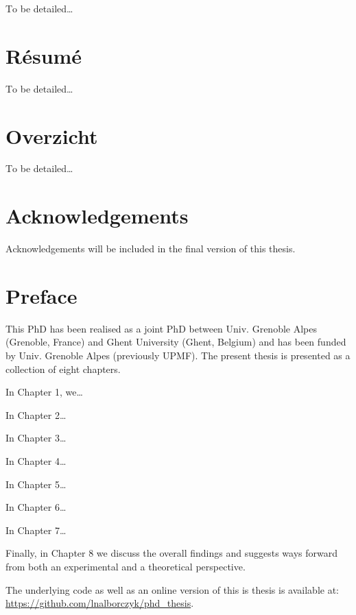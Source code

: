\documentclass[a4paper,12pt,twoside,openright,oldfontcommands]{memoir}
\newcommand{\initial}[1]{
	\lettrine[lines=3,lhang=0.33,nindent=0em]{
		\color{gray}
     		{\textsc{#1}}}{}}
\newcommand\blankpage{%
    \null
    \thispagestyle{empty}%
    \newpage
    }
\begin{document}
\initial{T}o be detailed\ldots{}

\afterpage{\blankpage}

\chapter*{Résumé}

\initial{T}o be detailed\ldots{}

\afterpage{\blankpage}

\chapter*{Overzicht}

\initial{T}o be detailed\ldots{}

\afterpage{\blankpage}

\chapter*{Acknowledgements}

\initial{A}cknowledgements will be included in the final version of this thesis.

\afterpage{\blankpage}

\chapter*{Preface}

\initial{T}his PhD has been realised as a joint PhD between Univ. Grenoble Alpes (Grenoble, France) and Ghent University (Ghent, Belgium) and has been funded by Univ. Grenoble Alpes (previously UPMF). The present thesis is presented as a collection of eight chapters.

In Chapter 1, we\ldots{}

In Chapter 2\ldots{}

In Chapter 3\ldots{}

In Chapter 4\ldots{}

In Chapter 5\ldots{}

In Chapter 6\ldots{}

In Chapter 7\ldots{}

Finally, in Chapter 8 we discuss the overall findings and suggests ways forward from both an experimental and a theoretical perspective.

The underlying code as well as an online version of this is thesis is available at: \url{https://github.com/lnalborczyk/phd_thesis}.

\newpage
\blankpage
\end{document}
